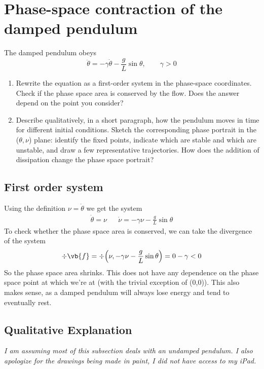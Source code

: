 \clearpage
\section{Phase-space contraction of the damped pendulum}
\begin{colbox}
	The damped pendulum obeys
	\begin{equation}
		\ddot{\theta}=-\gamma\dot{\theta}-\frac{g}{L}\sin\theta,\qquad\gamma>0
	\end{equation}
	\begin{enumerate}
		\item Rewrite the equation as a first-order system in the phase-space coordinates. Check if the phase space area is conserved by the flow. Does the answer depend on the point you consider?
		\item Describe qualitatively, in a short paragraph, how the pendulum moves in time for different initial conditions. Sketch the corresponding phase portrait in the (\(\theta,\nu\)) plane: identify the fixed points, indicate which are stable and which are unstable, and draw a few representative trajectories. How does the addition of dissipation change the phase space portrait?
	\end{enumerate}
\end{colbox}
\subsection{First order system}
Using the definition \(\nu = \dot{\theta}\) we get the system
\begin{align}
	\dot{\theta} = \nu && \dot{\nu} = -\gamma\nu - \frac{g}{L}\sin\theta
\end{align}
To check whether the phase space area is conserved, we can take the divergence of the system
\begin{equation}
	\div{\vb{f}} = \div{\ins{\nu,-\gamma\nu-\frac{g}{L}\sin\theta}} = 0-\gamma < 0
\end{equation}
So the phase space area shrinks. This does not have any dependence on the phase space point at which we're at (with the trivial exception of (0,0)). This also makes sense, as a damped pendulum will always lose energy and tend to eventually rest.
\subsection{Qualitative Explanation}
\emph{I am assuming most of this subsection deals with an undamped pendulum. I also apologize for the drawings being made in paint, I did not have access to my iPad.}

